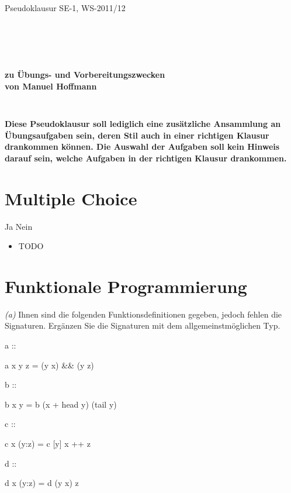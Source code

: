 \documentclass[11pt,a4paper,oneside,ngerman]{scrbook}
\begin{document}
\thispagestyle{empty}
\begin{center}
\Large{\LARGE{Pseudoklausur SE-1, WS-2011/12}}
\end{center}
\begin{verbatim}





\end{verbatim}
\begin{center}
\textbf{{zu Übungs- und Vorbereitungszwecken\\}}
\textbf{{von Manuel Hoffmann}}
\end{center}
\begin{verbatim}


\end{verbatim}
\begin{center}
\textbf{Diese Pseudoklausur soll lediglich eine zusätzliche Ansammlung an Übungsaufgaben sein, deren Stil
auch in einer richtigen Klausur drankommen können. Die Auswahl der Aufgaben soll kein Hinweis darauf sein,
welche Aufgaben in der richtigen Klausur drankommen.}
\end{center}



\newpage

\section{Multiple Choice}
Ja Nein
\begin{itemize}[label={\Square \ \Square}]
\item TODO
\end{itemize}


\newpage

\section{Funktionale Programmierung}


\emph{(a)} Ihnen sind die folgenden Funktionsdefinitionen gegeben, jedoch fehlen die Signaturen. Ergänzen Sie die Signaturen mit dem allgemeinstmöglichen Typ.
\begin{code}
  a :: 

  a x y z = (y x) && (y z)

  
  b :: 
  
  b x y = b (x + head y) (tail y)

  
  c ::
  
  c x (y:z) = c [y] x ++ z

  
  d ::
  
  d x (y:z) = d (y x) z
\end{code}
\end{document}
